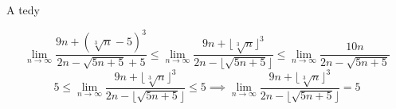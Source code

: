 \documentclass[10pt,a4paper]{article}
\theoremstyle{plain}
\theoremstyle{definition}
\begin{document}
A tedy

\[ 
\lim_{n \to \infty} \frac{9n + (\sqrt[3]{n}-5)^3}{2n -  \sqrt{5n+5} + 5} 
\leq 
\lim_{n \to \infty} \frac{9n + \lfloor \sqrt[3]{n} \rfloor^3}{2n - \lfloor \sqrt{5n+5} \rfloor} 
\leq 
\lim_{n \to \infty} \frac{10n}{2n -  \sqrt{5n+5}}\]
\[
5
\leq 
\lim_{n \to \infty} \frac{9n + \lfloor \sqrt[3]{n} \rfloor^3}{2n - \lfloor \sqrt{5n+5} \rfloor} 
\leq
5
\implies \lim_{n \to \infty} \frac{9n + \lfloor \sqrt[3]{n} \rfloor^3}{2n - \lfloor \sqrt{5n+5} \rfloor}  = 5 \]
\end{document}
